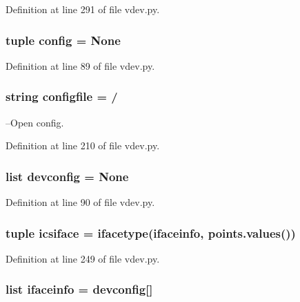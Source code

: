 Definition at line 291 of file vdev.\+py.

\subsubsection[{config}]{\setlength{\rightskip}{0pt plus 5cm}tuple config = None}\label{namespacevdev_ad5f91786d7c873886a576621a2c1b0b5}


Definition at line 89 of file vdev.\+py.

\subsubsection[{configfile}]{\setlength{\rightskip}{0pt plus 5cm}string configfile = \textquotesingle{}/\textquotesingle{}}\label{namespacevdev_a396bda2f457786351678a3c643731c6d}


--Open config. 



Definition at line 210 of file vdev.\+py.

\subsubsection[{devconfig}]{\setlength{\rightskip}{0pt plus 5cm}list devconfig = None}\label{namespacevdev_a9b69825da704c2d2744ac94730120447}


Definition at line 90 of file vdev.\+py.

\subsubsection[{icsiface}]{\setlength{\rightskip}{0pt plus 5cm}tuple icsiface = {\bf ifacetype}({\bf ifaceinfo}, {\bf points.\+values}())}\label{namespacevdev_ad92ea964f1873ac469cfab527165c427}


Definition at line 249 of file vdev.\+py.

\subsubsection[{ifaceinfo}]{\setlength{\rightskip}{0pt plus 5cm}list ifaceinfo = {\bf devconfig}[\textquotesingle{}]}\label{namespacevdev_a572e2ebf2df47cc5a806510b9ba577bf}


